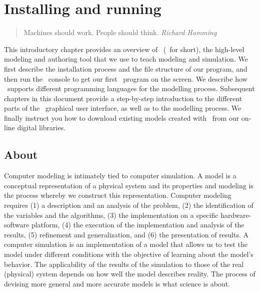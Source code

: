 
\chapter{Installing and running \Ejs}\label{chapter:EjsIntro}

\begin{quote}
Machines should work. People should think.  {\em Richard Hamming}
\end{quote}

This introductory chapter provides an overview of \Ejs\ (\ejs\ for short), the high-level modeling and authoring tool that we use to teach modeling and simulation. We first describe the installation process and the file structure of our program, and then run the \ejs\ console to get our first \ejs\ program on the screen. We describe how \Ejs\  supports different programming languages for the modelling process. Subsequent chapters in this document provide a step-by-step introduction to the different parts of the \ejs\ graphical user interface, as well as to the modelling process. We finally instruct you how to download existing models created with \ejs\ from our on-line digital libraries.

  \section{About \Ejs}

Computer modeling is intimately tied to computer simulation.  A model is a conceptual representation of a physical system and its properties and modeling is the process whereby we construct this representation. Computer modeling requires (1) a description and an analysis of the problem, (2) the identification of the variables and the algorithms, (3) the implementation on a specific hardware-software platform, (4) the execution of the implementation and analysis of the results, (5) refinement and generalization, and (6) the presentation of results.
A computer simulation is an implementation of a model that allows us to test the model under different
conditions with the objective of learning about the model's behavior.  The applicability of the
results of the simulation to those of the real (physical) system depends on how well the model describes
reality. The process of devising more general and more accurate models is what science is
about.

